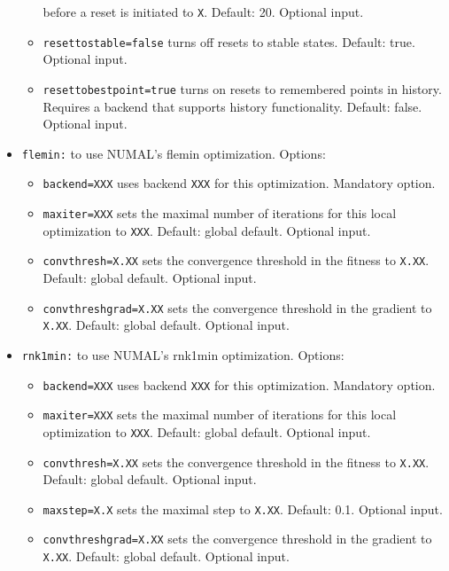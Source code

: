 \documentclass[a4paper,10pt]{scrbook}
\begin{document}
\begin{itemize}
\begin{itemize}
before a reset is initiated to \texttt{X}. Default: 20. Optional input.
      \item \texttt{resettostable=false} turns off resets to stable states.
Default: true. Optional input.
      \item \texttt{resettobestpoint=true} turns on resets to remembered
points in history. Requires a backend that supports history functionality.
Default: false. Optional input.
    \end{itemize}
  \item \texttt{flemin:} to use NUMAL's flemin optimization. Options:
    \begin{itemize}
      \item \texttt{backend=XXX} uses backend \texttt{XXX} for this 
optimization. Mandatory option.
      \item \texttt{maxiter=XXX} sets the maximal number of iterations for this 
local optimization to \texttt{XXX}. Default: global default. Optional input.
      \item \texttt{convthresh=X.XX} sets the convergence threshold in the 
fitness to \texttt{X.XX}. Default: global default. Optional input.
      \item \texttt{convthreshgrad=X.XX} sets the convergence threshold in the 
gradient to \texttt{X.XX}. Default: global default. Optional input.
    \end{itemize}
  \item \texttt{rnk1min:} to use NUMAL's rnk1min optimization. Options:
    \begin{itemize}
      \item \texttt{backend=XXX} uses backend \texttt{XXX} for this 
optimization. Mandatory option.
      \item \texttt{maxiter=XXX} sets the maximal number of iterations for this 
local optimization to \texttt{XXX}. Default: global default. Optional input.
      \item \texttt{convthresh=X.XX} sets the convergence threshold in the 
fitness to \texttt{X.XX}. Default: global default. Optional input.
      \item \texttt{maxstep=X.X} sets the maximal step to \texttt{X.XX}. 
Default: 0.1. Optional input.
      \item \texttt{convthreshgrad=X.XX} sets the convergence threshold in the 
gradient to \texttt{X.XX}. Default: global default. Optional input.
    \end{itemize}

\end{itemize}
\end{document}
